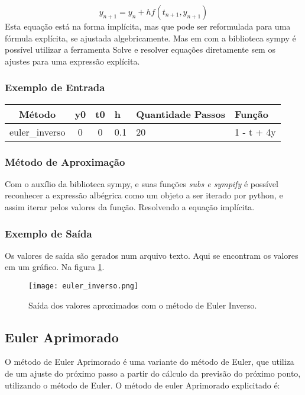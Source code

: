 \documentclass[a4paper]{article}
\begin{document}
\begin{equation}\label{eq:eq_euler_inverso}
    y_{n+1} = y_n + hf(t_{n+1},y_{n+1})
\end{equation}
Esta equação está na forma implícita, mas que pode ser reformulada para uma fórmula explícita, se ajustada algebricamente. Mas em com a biblioteca sympy é possível utilizar a ferramenta Solve e resolver equações diretamente sem os ajustes para uma expressão explícita.

\subsubsection{Exemplo de Entrada}
    \begin{table}[H]
        \centering
        \begin{tabular}{|c|c|c|l|l|l|}
        \hline
        Método & y0 & t0 & h   & Quantidade Passos & Função \\ \hline
        euler\_inverso  & 0  & 0  & 0.1 & 20                &  1 - t + 4y      \\ \hline
    \end{tabular}
\end{table}
\subsubsection{Método de Aproximação}
Com o auxílio da biblioteca sympy, e suas funções \textit{subs e sympify} é possível reconhecer a expressão albégrica como um objeto a ser iterado por python, e assim iterar pelos valores da função. Resolvendo a equação implícita.
\subsubsection{Exemplo de Saída}
Os valores de saída são gerados num arquivo texto. Aqui se encontram os valores em um gráfico. Na figura \ref{fig:euler_inverso}.
\begin{figure}
\centering
\texttt{[image: euler\_inverso.png]}
\caption{\label{fig:euler_inverso}Saída dos valores aproximados com o método de Euler Inverso.}
\end{figure}


\subsection{Euler Aprimorado}

O método de Euler Aprimorado é uma variante do método de Euler, que utiliza de um ajuste do próximo passo a partir do cálculo da previsão do próximo ponto, utilizando o método de Euler. 
O método de euler Aprimorado explicitado é:
\end{document}
